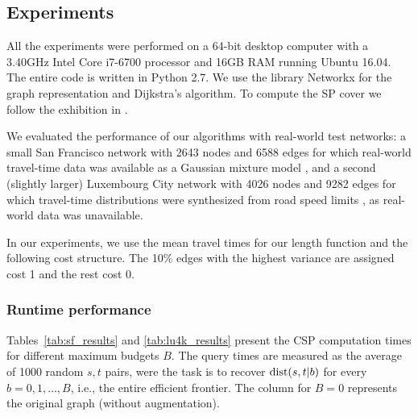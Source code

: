 \subsection{Experiments}

All the experiments were performed on a 64-bit desktop computer with a 3.40GHz Intel Core i7-6700 processor and 16GB RAM running Ubuntu 16.04.
The entire code is written in Python 2.7. We use the library Networkx for the graph representation and Dijkstra's algorithm.
To compute the SP cover we follow the exhibition in \cite{hubimplem}.

We evaluated the performance of our algorithms with real-world test networks: a small San Francisco network with 2643 nodes and 6588 edges for which real-world travel-time data was available as a Gaussian mixture model \cite{sf_data}, and a second (slightly larger) Luxembourg City network with 4026 nodes and 9282 edges for which travel-time distributions were synthesized from road speed limits \cite{niknami2016tractable}, as real-world data was unavailable.
 
In our experiments, we use the mean travel times for our length function and the following cost structure. The 10\% edges with the highest variance are assigned cost 1 and the rest cost 0.

\subsubsection{Runtime performance}


Tables~\ref{tab:sf_results} and \ref{tab:lu4k_results} present the CSP computation times for different maximum budgets $B$. The query times are measured as the average of 1000 random $s,t$ pairs, were the task is to recover $\text{dist}(s,t|b)$ for every $b=0,1,\ldots,B$, i.e., the entire efficient frontier.  The column for $B=0$ represents the original graph (without augmentation).

